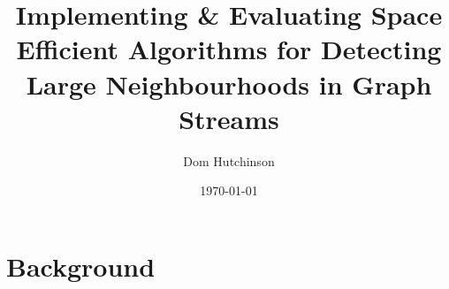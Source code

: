 \documentclass[11pt,twoside,a4paper]{report}
\begin{document}
\renewcommand{\headrulewidth}{0pt}
\newcommand{\ie}{\textit{i.e.} }
\newcommand{\nats}{\mathbb{N} }
\newcommand{\horizontalline}{\newline\vspace{.3cm}\hfill\makebox[.5\linewidth]{\rule{.5\textwidth}{0.4pt}}\hfill\vspace{.1cm}}
\title{Implementing \& Evaluating Space Efficient Algorithms for Detecting Large Neighbourhoods in Graph Streams}
\author{Dom Hutchinson}
\date{\today}
\maketitle

\pagestyle{fancy}
\fancyhead[C]{}
\fancyhead[R]{\today}

\DontPrintSemicolon %

\chapter{Background}
\end{document}
